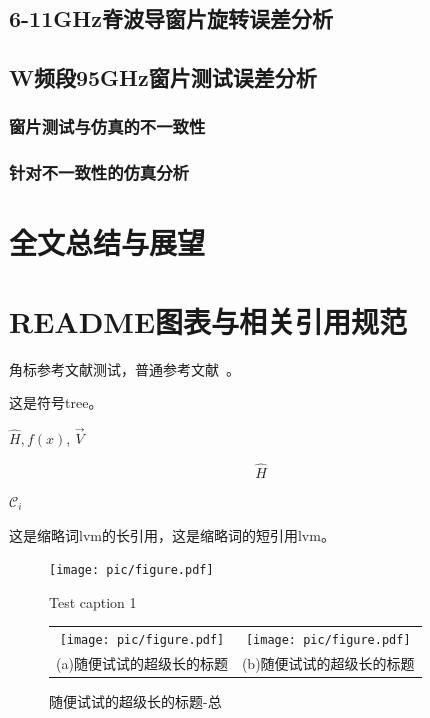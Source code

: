 \documentclass[master]{thesis-uestc}
\begin{document}
\section{6-11GHz脊波导窗片旋转误差分析}
\section{W频段95GHz窗片测试误差分析}
\subsection{窗片测试与仿真的不一致性}
\subsection{针对不一致性的仿真分析}

\chapter{全文总结与展望}
\chapter{README图表与相关引用规范}

角标参考文献测试，普通参考文献~\cite{clerc2010discrete}。

这是符号\gls{tree}\cite{liuxf2006}。

$\hat{H}, f(x)$, $\vec{V}$

$$\hat{H}$$

$\mathcal{C}_i$

这是缩略词\acrlong{lvm}的长引用，这是缩略词的短引用\acrshort{lvm}。

\begin{figure}[!htb]
    \texttt{[image: pic/figure.pdf]}
    \caption[short catption 1]{Test caption 1}
\end{figure}


\begin{figure}[!htb]
    \small
    \centering
    \begin{tabular}{@{\ }c@{\ }c}
        \texttt{[image: pic/figure.pdf]} & 
        \hspace{5pt}
        \texttt{[image: pic/figure.pdf]}     \\
        \mbox{\small (a)随便试试的超级长的标题}                                                                               & 
        \mbox{\small (b)随便试试的超级长的标题}                                                                                  \\
    \end{tabular}
    \caption{随便试试的超级长的标题-总}
    \label{fig:test}
\end{figure}
\end{document}
